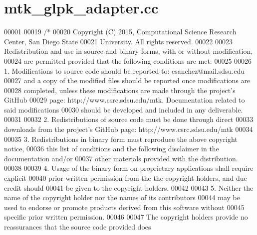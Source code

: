 \hypertarget{mtk__glpk__adapter_8cc_source}{\section{mtk\+\_\+glpk\+\_\+adapter.\+cc}
\label{mtk__glpk__adapter_8cc_source}
}

\begin{DoxyCode}
00001 
00019 \textcolor{comment}{/*}
00020 \textcolor{comment}{Copyright (C) 2015, Computational Science Research Center, San Diego State}
00021 \textcolor{comment}{University. All rights reserved.}
00022 \textcolor{comment}{}
00023 \textcolor{comment}{Redistribution and use in source and binary forms, with or without modification,}
00024 \textcolor{comment}{are permitted provided that the following conditions are met:}
00025 \textcolor{comment}{}
00026 \textcolor{comment}{1. Modifications to source code should be reported to: esanchez@mail.sdsu.edu}
00027 \textcolor{comment}{and a copy of the modified files should be reported once modifications are}
00028 \textcolor{comment}{completed, unless these modifications are made through the project's GitHub}
00029 \textcolor{comment}{page: http://www.csrc.sdsu.edu/mtk. Documentation related to said modifications}
00030 \textcolor{comment}{should be developed and included in any deliverable.}
00031 \textcolor{comment}{}
00032 \textcolor{comment}{2. Redistributions of source code must be done through direct}
00033 \textcolor{comment}{downloads from the project's GitHub page: http://www.csrc.sdsu.edu/mtk}
00034 \textcolor{comment}{}
00035 \textcolor{comment}{3. Redistributions in binary form must reproduce the above copyright notice,}
00036 \textcolor{comment}{this list of conditions and the following disclaimer in the documentation and/or}
00037 \textcolor{comment}{other materials provided with the distribution.}
00038 \textcolor{comment}{}
00039 \textcolor{comment}{4. Usage of the binary form on proprietary applications shall require explicit}
00040 \textcolor{comment}{prior written permission from the the copyright holders, and due credit should}
00041 \textcolor{comment}{be given to the copyright holders.}
00042 \textcolor{comment}{}
00043 \textcolor{comment}{5. Neither the name of the copyright holder nor the names of its contributors}
00044 \textcolor{comment}{may be used to endorse or promote products derived from this software without}
00045 \textcolor{comment}{specific prior written permission.}
00046 \textcolor{comment}{}
00047 \textcolor{comment}{The copyright holders provide no reassurances that the source code provided does}

\end{DoxyCode}
